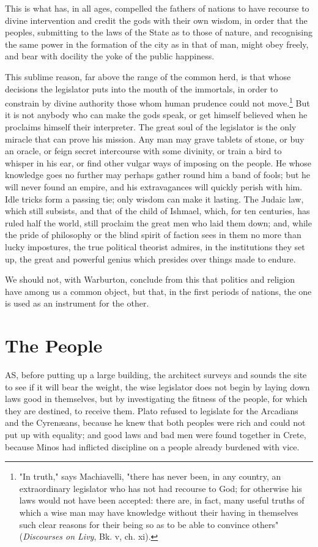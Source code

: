 \documentclass[12pt]{report}
\begin{document}
This is what has, in all ages, compelled the fathers of nations to have recourse to divine intervention and credit the gods with their own wisdom, in order that the peoples, submitting to the laws of the State as to those of nature, and recognising the same power in the formation of the city as in that of man, might obey freely, and bear with docility the yoke of the public happiness.

This sublime reason, far above the range of the common herd, is that whose decisions the legislator puts into the mouth of the immortals, in order to constrain by divine authority those whom human prudence could not move.\footnote{"In truth," says Machiavelli, "there has never been, in any country, an extraordinary legislator who has not had recourse to God; for otherwise his laws would not have been accepted: there are, in fact, many useful truths of which a wise man may have knowledge without their having in themselves such clear reasons for their being so as to be able to convince others" (\textit{Discourses on Livy}, Bk. v, ch. xi).} But it is not anybody who can make the gods speak, or get himself believed when he proclaims himself their interpreter. The great soul of the legislator is the only miracle that can prove his mission. Any man may grave tablets of stone, or buy an oracle, or feign secret intercourse with some divinity, or train a bird to whisper in his ear, or find other vulgar ways of imposing on the people. He whose knowledge goes no further may perhaps gather round him a band of fools; but he will never found an empire, and his extravagances will quickly perish with him. Idle tricks form a passing tie; only wisdom can make it lasting. The Judaic law, which still subsists, and that of the child of Ishmael, which, for ten centuries, has ruled half the world, still proclaim the great men who laid them down; and, while the pride of philosophy or the blind spirit of faction sees in them no more than lucky impostures, the true political theorist admires, in the institutions they set up, the great and powerful genius which presides over things made to endure.

We should not, with Warburton, conclude from this that politics and religion have among us a common object, but that, in the first periods of nations, the one is used as an instrument for the other.

\section{The People}
AS, before putting up a large building, the architect surveys and sounds the site to see if it will bear the weight, the wise legislator does not begin by laying down laws good in themselves, but by investigating the fitness of the people, for which they are destined, to receive them. Plato refused to legislate for the Arcadians and the Cyrenæans, because he knew that both peoples were rich and could not put up with equality; and good laws and bad men were found together in Crete, because Minos had inflicted discipline on a people already burdened with vice.
\end{document}
